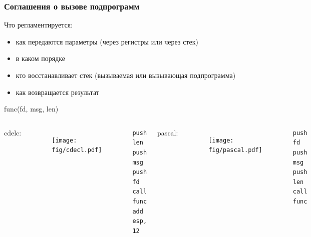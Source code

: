 \documentclass[utf8, russian]{beamer}
\begin{document}
    \begin{frame}[fragile]
        \frametitle{Соглашения о вызове подпрограмм}
    \begin{block}{Что регламентируется:}\small
        \begin{itemize}
            \item как передаются параметры (через регистры или через стек)
            \item в каком порядке
            \item кто восстанавливает стек (вызываемая или вызывающая подпрограмма)
            \item как возвращается результат
        \end{itemize}
    \end{block}
        \centerline{func(fd, msg, len)}
        \begin{columns}
            \centerline{cdelc:}
            \begin{columns}
                    \begin{figure}
                        \texttt{[image: fig/cdecl.pdf]}
                    \end{figure}
                \begin{verbatim}
push len
push msg
push fd
call func
add esp, 12
                \end{verbatim}
            \end{columns}

            \centerline{pascal:}
            \begin{columns}
                    \begin{figure}
                        \texttt{[image: fig/pascal.pdf]}
                    \end{figure}
                \begin{verbatim}
push fd
push msg
push len
call func

                \end{verbatim}
            \end{columns}
        \end{columns}
\end{frame}
\end{document}
